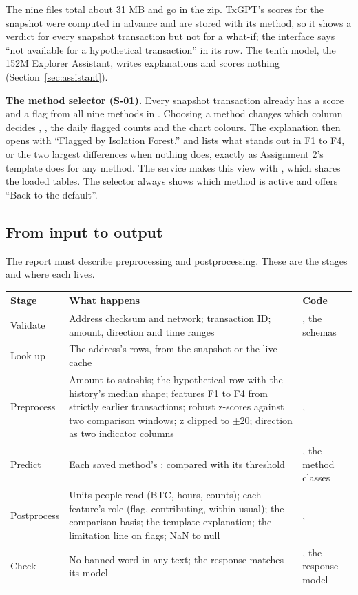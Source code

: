 The nine files total about 31 MB and go in the zip. TxGPT's scores for the snapshot were computed
in advance and are stored with its method, so it shows a verdict for every snapshot transaction but
not for a what-if; the interface says ``not available for a hypothetical transaction'' in its row.
The tenth model, the 152M Explorer Assistant, writes explanations and scores nothing
(Section~\ref{sec:assistant}).

\textbf{The method selector (S-01).} Every snapshot transaction already has a score and a flag
from all nine methods in . Choosing a method changes which column decides
, , the daily flagged counts and the chart colours. The explanation then
opens with ``Flagged by Isolation Forest.'' and lists what stands out in F1 to F4, or the two largest
differences when nothing does, exactly as Assignment 2's template does for any method. The service
makes this view with , which shares the loaded
tables. The selector always shows which method is active and offers ``Back to the default''.

\subsection{From input to output}
\label{sec:prepost}

The report must describe preprocessing and postprocessing. These are the stages and where each
lives.

\begin{center}
\small
\begin{tabularx}{\textwidth}{@{}L{2.6cm}Y L{4.1cm}@{}}
\toprule
\textbf{Stage} & \textbf{What happens} & \textbf{Code} \\
\midrule
Validate & Address checksum and network; transaction ID; amount, direction and time ranges & , the schemas \\
Look up & The address's rows, from the snapshot or the live cache &  \\
Preprocess & Amount to satoshis; the hypothetical row with the history's median shape; features F1 to F4 from strictly earlier transactions; robust z-scores against two comparison windows; z clipped to $\pm 20$; direction as two indicator columns & ,  \\
Predict & Each saved method's ; compared with its threshold & , the method classes \\
Postprocess & Units people read (BTC, hours, counts); each feature's role (flag, contributing, within usual); the comparison basis; the template explanation; the limitation line on flags; NaN to null & ,  \\
Check & No banned word in any text; the response matches its model & , the response model \\
\bottomrule
\end{tabularx}
\end{center}

